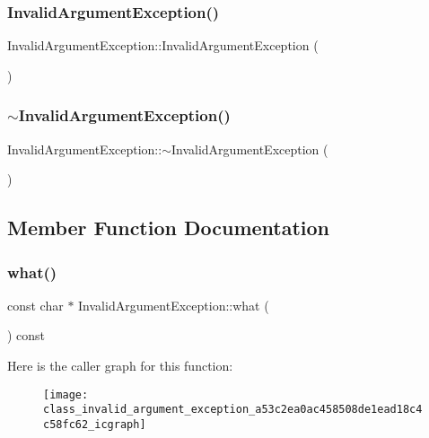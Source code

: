 \subsubsection{\texorpdfstring{InvalidArgumentException()}{InvalidArgumentException()}}
{\footnotesize\ttfamily Invalid\+Argument\+Exception\+::\+Invalid\+Argument\+Exception (\begin{DoxyParamCaption}{ }\end{DoxyParamCaption})}

\mbox{\label{class_invalid_argument_exception_aef9114d478766e6c542eb68a26beb1ec}} 
\subsubsection{\texorpdfstring{$\sim$InvalidArgumentException()}{~InvalidArgumentException()}}
{\footnotesize\ttfamily Invalid\+Argument\+Exception\+::$\sim$\+Invalid\+Argument\+Exception (\begin{DoxyParamCaption}{ }\end{DoxyParamCaption})}



\subsection{Member Function Documentation}
\mbox{\label{class_invalid_argument_exception_a53c2ea0ac458508de1ead18c4c58fc62}} 
\subsubsection{\texorpdfstring{what()}{what()}}
{\footnotesize\ttfamily const char $\ast$ Invalid\+Argument\+Exception\+::what (\begin{DoxyParamCaption}{ }\end{DoxyParamCaption}) const\hspace{0.3cm}{\ttfamily [noexcept]}}

Here is the caller graph for this function\+:
\nopagebreak
\begin{figure}[H]
\begin{center}
\leavevmode
\texttt{[image: class\_invalid\_argument\_exception\_a53c2ea0ac458508de1ead18c4c58fc62\_icgraph]}
\end{center}
\end{figure}


